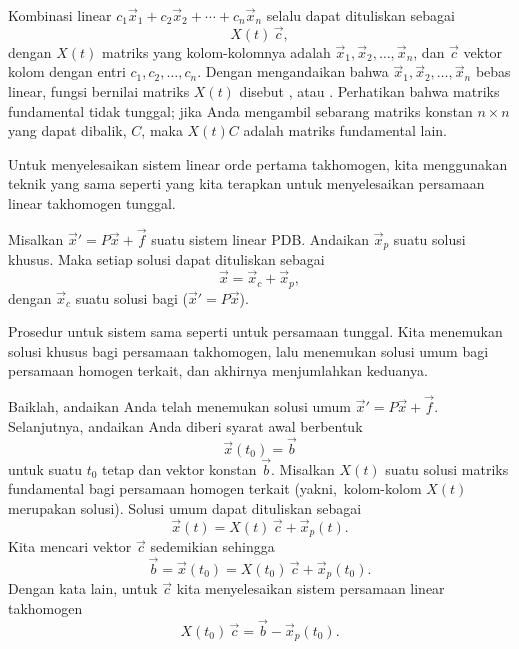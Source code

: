 Kombinasi linear $c_1 \vec{x}_1 + c_2 \vec{x}_2 + \cdots + c_n
\vec{x}_n$ selalu dapat dituliskan sebagai
\begin{equation*}
X(t)\,\vec{c} ,
\end{equation*}
dengan $X(t)$ matriks yang kolom-kolomnya adalah $\vec{x}_1, \vec{x}_2, \ldots, \vec{x}_n$,
dan $\vec{c}$ vektor kolom dengan entri $c_1, c_2, \ldots, c_n$.
Dengan mengandaikan bahwa $\vec{x}_1,\vec{x}_2,\ldots,\vec{x}_n$ bebas
linear,
fungsi bernilai matriks $X(t)$ disebut \emph{},
atau \emph{}.
Perhatikan bahwa matriks fundamental tidak tunggal; jika Anda mengambil sebarang matriks
konstan $n\times n$ yang dapat dibalik, $C$, maka $X(t) C$ adalah matriks fundamental lain.

\medskip

Untuk menyelesaikan sistem linear orde pertama takhomogen, kita menggunakan
teknik yang sama seperti yang kita terapkan untuk menyelesaikan persamaan linear takhomogen tunggal.

\begin{theorem}
Misalkan
${\vec{x}}' = P\vec{x} + \vec{f}$ suatu sistem linear PDB.
Andaikan $\vec{x}_p$ suatu solusi khusus.  Maka setiap solusi
dapat dituliskan sebagai
\begin{equation*}
\vec{x} = \vec{x}_c + \vec{x}_p ,
\end{equation*}
dengan $\vec{x}_c$ suatu solusi bagi
(${\vec{x}}' = P\vec{x}$).
\end{theorem}

Prosedur untuk sistem sama seperti untuk persamaan tunggal.
Kita menemukan solusi khusus
bagi persamaan takhomogen, lalu menemukan solusi umum bagi
persamaan homogen terkait, dan akhirnya menjumlahkan keduanya.

\medskip

Baiklah, andaikan Anda telah menemukan solusi umum
${\vec{x}}' = P\vec{x} + \vec{f}$.  Selanjutnya, andaikan Anda diberi
syarat awal berbentuk
\begin{equation*}
\vec{x}(t_0) = \vec{b}
\end{equation*}
untuk suatu $t_0$ tetap dan vektor konstan
$\vec{b}$.  Misalkan $X(t)$ suatu solusi matriks fundamental
bagi persamaan homogen terkait
(yakni,\ kolom-kolom $X(t)$ merupakan solusi).  Solusi umum dapat
dituliskan sebagai
\begin{equation*}
\vec{x}(t) = X(t)\,\vec{c} + \vec{x}_p(t).
\end{equation*}
Kita mencari vektor
$\vec{c}$ sedemikian sehingga
\begin{equation*}
\vec{b} = \vec{x}(t_0) = X(t_0)\,\vec{c} + \vec{x}_p(t_0).
\end{equation*}
Dengan kata lain, untuk $\vec{c}$ kita menyelesaikan sistem persamaan linear takhomogen
\begin{equation*}
X(t_0)\,\vec{c} = \vec{b} - \vec{x}_p(t_0) .
\end{equation*}

